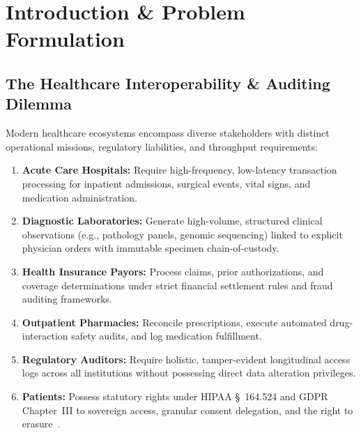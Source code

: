 \documentclass[conference]{IEEEtran}
\theoremstyle{definition}
\begin{document}
\section{Introduction \& Problem Formulation}

\subsection{The Healthcare Interoperability \& Auditing Dilemma}
Modern healthcare ecosystems encompass diverse stakeholders with distinct operational missions, regulatory liabilities, and throughput requirements:
\begin{enumerate}
    \item \textbf{Acute Care Hospitals:} Require high-frequency, low-latency transaction processing for inpatient admissions, surgical events, vital signs, and medication administration.
    \item \textbf{Diagnostic Laboratories:} Generate high-volume, structured clinical observations (e.g., pathology panels, genomic sequencing) linked to explicit physician orders with immutable specimen chain-of-custody.
    \item \textbf{Health Insurance Payors:} Process claims, prior authorizations, and coverage determinations under strict financial settlement rules and fraud auditing frameworks.
    \item \textbf{Outpatient Pharmacies:} Reconcile prescriptions, execute automated drug-interaction safety audits, and log medication fulfillment.
    \item \textbf{Regulatory Auditors:} Require holistic, tamper-evident longitudinal access logs across all institutions without possessing direct data alteration privileges.
    \item \textbf{Patients:} Possess statutory rights under HIPAA \S~164.524 and GDPR Chapter~III to sovereign access, granular consent delegation, and the right to erasure~\cite{hipaa1996, gdpr2016, politou2018forgetting}.
\end{enumerate}
\end{document}
